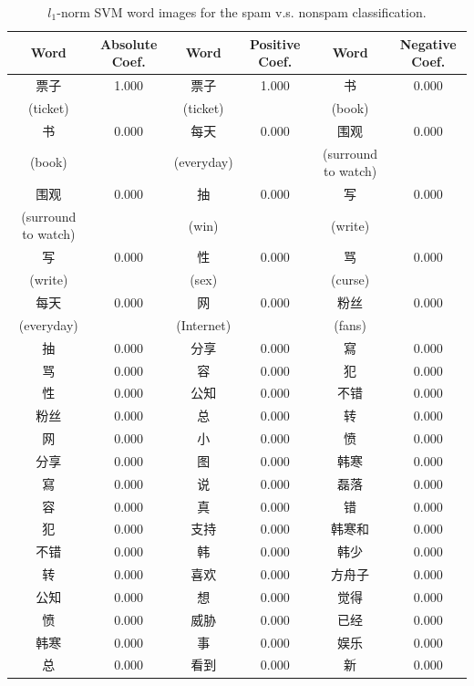 \documentclass[11pt]{article}
\newcommand{\1}[1]{{\mathbf 1}\left\{#1\right\}}        %
\begin{document}
\begin{table}[!h]
\caption{$l_1$-norm SVM word images for the spam v.s. nonspam classification.}
\begin{center}
\begin{tabular}{|c|c||c|c||c|c|}
\hline
Word & Absolute Coef. & Word & Positive Coef. & Word & Negative Coef.\\ \hline\hline
票子 & 1.000 & 票子 & 1.000 & 书 & 0.000\\
(ticket) & & (ticket) & & (book) & \\\hline
书 & 0.000 & 每天 & 0.000 & 围观 & 0.000\\
(book) & & (everyday) & & (surround to watch) & \\\hline
围观 & 0.000 & 抽 & 0.000 & 写 & 0.000\\
(surround to watch) & & (win) & & (write) & \\\hline
写 & 0.000 & 性 & 0.000 & 骂 & 0.000\\
(write) & & (sex) & & (curse) & \\\hline
每天 & 0.000 & 网 & 0.000 & 粉丝 & 0.000\\
(everyday) & & (Internet) & & (fans) & \\\hline
抽 & 0.000 & 分享 & 0.000 & 寫 & 0.000\\ \hline
骂 & 0.000 & 容 & 0.000 & 犯 & 0.000\\ \hline
性 & 0.000 & 公知 & 0.000 & 不错 & 0.000\\ \hline
粉丝 & 0.000 & 总 & 0.000 & 转 & 0.000\\ \hline
网 & 0.000 & 小 & 0.000 & 愤 & 0.000\\ \hline
分享 & 0.000 & 图 & 0.000 & 韩寒 & 0.000\\ \hline
寫 & 0.000 & 说 & 0.000 & 磊落 & 0.000\\ \hline
容 & 0.000 & 真 & 0.000 & 错 & 0.000\\ \hline
犯 & 0.000 & 支持 & 0.000 & 韩寒和 & 0.000\\ \hline
不错 & 0.000 & 韩 & 0.000 & 韩少 & 0.000\\ \hline
转 & 0.000 & 喜欢 & 0.000 & 方舟子 & 0.000\\ \hline
公知 & 0.000 & 想 & 0.000 & 觉得 & 0.000\\ \hline
愤 & 0.000 & 威胁 & 0.000 & 已经 & 0.000\\ \hline
韩寒 & 0.000 & 事 & 0.000 & 娱乐 & 0.000\\ \hline
总 & 0.000 & 看到 & 0.000 & 新 & 0.000\\ \hline
\end{tabular}
\label{tb:svmfullspam}
\end{center}
\end{table}








\end{document}
